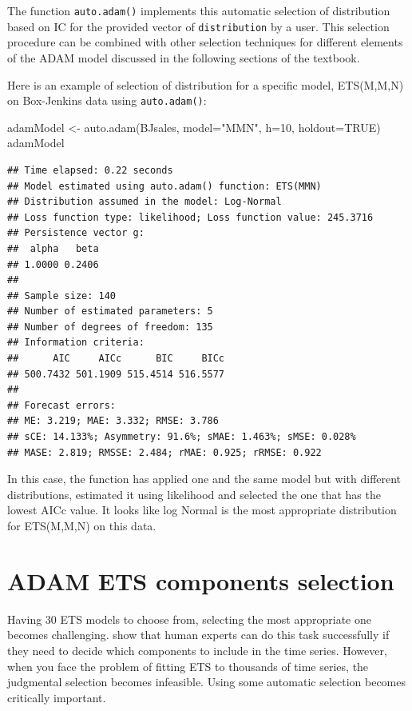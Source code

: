 \documentclass[
]{book}
\newenvironment{Shaded}{\begin{snugshade}}{\end{snugshade}}
\newcommand{\AttributeTok}[1]{\textcolor[rgb]{0.77,0.63,0.00}{#1}}
\newcommand{\ConstantTok}[1]{\textcolor[rgb]{0.00,0.00,0.00}{#1}}
\newcommand{\DecValTok}[1]{\textcolor[rgb]{0.00,0.00,0.81}{#1}}
\newcommand{\FunctionTok}[1]{\textcolor[rgb]{0.00,0.00,0.00}{#1}}
\newcommand{\NormalTok}[1]{#1}
\newcommand{\OtherTok}[1]{\textcolor[rgb]{0.56,0.35,0.01}{#1}}
\newcommand{\StringTok}[1]{\textcolor[rgb]{0.31,0.60,0.02}{#1}}
\theoremstyle{definition}
\theoremstyle{definition}
\theoremstyle{definition}
\theoremstyle{definition}
\theoremstyle{remark}
\begin{document}
The function \texttt{auto.adam()} implements this automatic selection of distribution based on IC for the provided vector of \texttt{distribution} by a user. This selection procedure can be combined with other selection techniques for different elements of the ADAM model discussed in the following sections of the textbook.

Here is an example of selection of distribution for a specific model, ETS(M,M,N) on Box-Jenkins data using \texttt{auto.adam()}:

\begin{Shaded}
\begin{Highlighting}[]
\NormalTok{adamModel }\OtherTok{\textless{}{-}} \FunctionTok{auto.adam}\NormalTok{(BJsales, }\AttributeTok{model=}\StringTok{"MMN"}\NormalTok{, }\AttributeTok{h=}\DecValTok{10}\NormalTok{, }\AttributeTok{holdout=}\ConstantTok{TRUE}\NormalTok{)}
\NormalTok{adamModel}
\end{Highlighting}
\end{Shaded}

\begin{verbatim}
## Time elapsed: 0.22 seconds
## Model estimated using auto.adam() function: ETS(MMN)
## Distribution assumed in the model: Log-Normal
## Loss function type: likelihood; Loss function value: 245.3716
## Persistence vector g:
##  alpha   beta 
## 1.0000 0.2406 
## 
## Sample size: 140
## Number of estimated parameters: 5
## Number of degrees of freedom: 135
## Information criteria:
##      AIC     AICc      BIC     BICc 
## 500.7432 501.1909 515.4514 516.5577 
## 
## Forecast errors:
## ME: 3.219; MAE: 3.332; RMSE: 3.786
## sCE: 14.133%; Asymmetry: 91.6%; sMAE: 1.463%; sMSE: 0.028%
## MASE: 2.819; RMSSE: 2.484; rMAE: 0.925; rRMSE: 0.922
\end{verbatim}

In this case, the function has applied one and the same model but with different distributions, estimated it using likelihood and selected the one that has the lowest AICc value. It looks like log Normal is the most appropriate distribution for ETS(M,M,N) on this data.

\hypertarget{ETSSelection}{%
\section{ADAM ETS components selection}\label{ETSSelection}}

Having 30 ETS models to choose from, selecting the most appropriate one becomes challenging. \citet{Petropoulos2018a} show that human experts can do this task successfully if they need to decide which components to include in the time series. However, when you face the problem of fitting ETS to thousands of time series, the judgmental selection becomes infeasible. Using some automatic selection becomes critically important.
\end{document}
